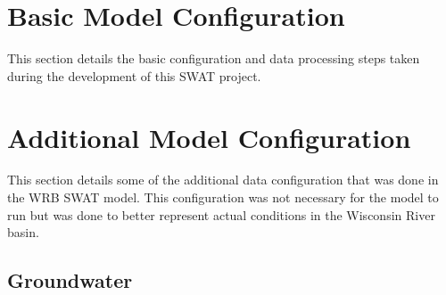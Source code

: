 	
\pagebreak
\section{Basic Model Configuration}\label{sec:basic_model_config}
This section details the basic configuration and data processing steps taken
during the development of this SWAT project.
	
	
	
	
	
	
	
	
\pagebreak


% 
	
\pagebreak
\section{Additional Model Configuration}
This section details some of the additional data configuration that was done in
the WRB SWAT model.
This configuration was not necessary for the model to run but was done to better
represent actual conditions in the Wisconsin River basin.
	
	
	
	
	
	
\subsection{Groundwater}
	
	
	
	
\pagebreak
